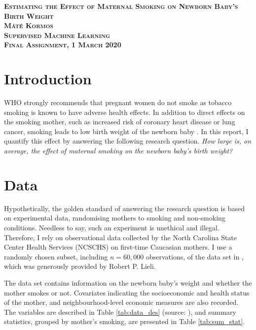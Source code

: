 \documentclass[a4paper,12pt]{article}
\begin{document}
\pagestyle{fancy}
\thispagestyle{myplain}
\begin{center}
{\large
\textbf{\textsc{Estimating the Effect of Maternal Smoking on Newborn Baby's Birth Weight}} \\
\vspace{0.2cm}
\textbf{\textsc{Máté Kormos}} }\\
\vspace{0.5cm}
\textbf{\textsc{Supervised Machine Learning}} \\
\textbf{\textsc{Final Assignment, 1 March 2020}}

\end{center}
\vspace{1cm}


\section{Introduction}


\noindent WHO strongly recommends that pregnant women do not smoke \citep{whopregnancy} as tobacco smoking is known to have adverse health effects. In addition to direct effects on the smoking mother, such as increased risk of coronary heart disease or lung cancer,  smoking leads to low birth weight of the newborn baby \citep{whosmoking}. In this report, I quantify this effect by answering the following research question. \textit{How large is, on average, the effect of maternal smoking on the newborn baby's birth weight?}



\section{Data}

\noindent Hypothetically, the golden standard of answering the research question is based on experimental data, randomising mothers to smoking and non-smoking conditions. Needless to say, such an experiment is unethical and illegal. Therefore, I rely on observational data collected by the North Carolina State Center Health Services (NCSCHS) on first-time Caucasian mothers. I use a randomly chosen subset, including $n=60,000$ observations, of the data set in \cite{abrevaya2015}, which was generously provided by Robert P. Lieli.

\noindent The data set contains information on the newborn baby's weight and whether the mother smokes or not. Covariates indicating the socioeconomic and health status of the mother, and neighbourhood-level economic measures are also recorded. The variables are described in Table \ref{tab:data_des} (source: \cite{fan2019}), and summary statistics, grouped by mother's smoking, are presented in Table \ref{tab:sum_stat}.
\end{document}
